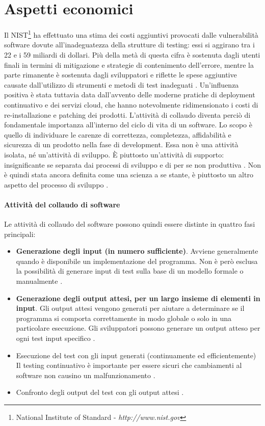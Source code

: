 \documentclass[../main.tex]{subfiles}
\begin{document}
\section{Aspetti economici}
Il NIST\footnote{National Institute of Standard - \textit{http://www.nist.gov}} ha effettuato una stima dei costi aggiuntivi provocati dalle vulnerabilità software dovute all'inadeguatezza della strutture di testing: essi si aggirano tra i 22 e i 59 miliardi di dollari. Più della metà di questa cifra è sostenuta dagli utenti finali in termini di mitigazione e strategie di contenimento dell'errore, mentre la parte rimanente è sostenuta dagli sviluppatori e riflette le spese aggiuntive causate dall'utilizzo di strumenti e metodi di test inadeguati \cite{NistEconomicImpact}. Un'influenza positiva è stata tuttavia data dall'avvento delle moderne pratiche di deployment continuativo e dei servizi cloud, che hanno notevolmente ridimensionato i costi di re-installazione e patching dei prodotti.\newline
L'attività di collaudo diventa perciò di fondamentale importanza all'interno del ciclo di vita di un software. Lo scopo è quello di individuare le carenze di correttezza, completezza, affidabilità e sicurezza di un prodotto nella fase di development.
Essa non è una attività isolata, né un'attività di sviluppo. È piuttosto un'attività di supporto: insignificante se separata dai processi di sviluppo e di per se non produttiva \cite{GAST}.\newline
Non è quindi stata ancora definita come una scienza a se stante, è piuttosto un altro aspetto del processo di sviluppo \cite{ArtOfSwTesting}.
\paragraph{Attività del collaudo di software}
Le attività di collaudo del software possono quindi essere distinte in quattro fasi principali:
\begin{itemize}
\item \textbf{Generazione degli input (in numero sufficiente)}. Avviene generalmente quando è disponibile un implementazione del programma. Non è però esclusa la possibilità di generare input di test sulla base di un modello formale \cite{DickFaivre93} o manualmente \cite{XieDissertation}.
\item \textbf{Generazione degli output attesi, per un largo insieme di elementi in input}. Gli output attesi vengono generati per aiutare a determinare se il programma si comporta correttamente in modo globale o solo in una particolare esecuzione. Gli sviluppatori possono generare un output atteso per ogni test input specifico
\cite{XieDissertation} \cite{Panzl78}.
\item Esecuzione del test con gli input generati (continuamente ed efficientemente) Il testing continuativo è importante per essere sicuri che cambiamenti al software non causino un malfunzionamento \cite{XieDissertation}.
\item Confronto degli output del test con gli output  attesi
\cite{XieDissertation}.
\end{itemize}
\end{document}
